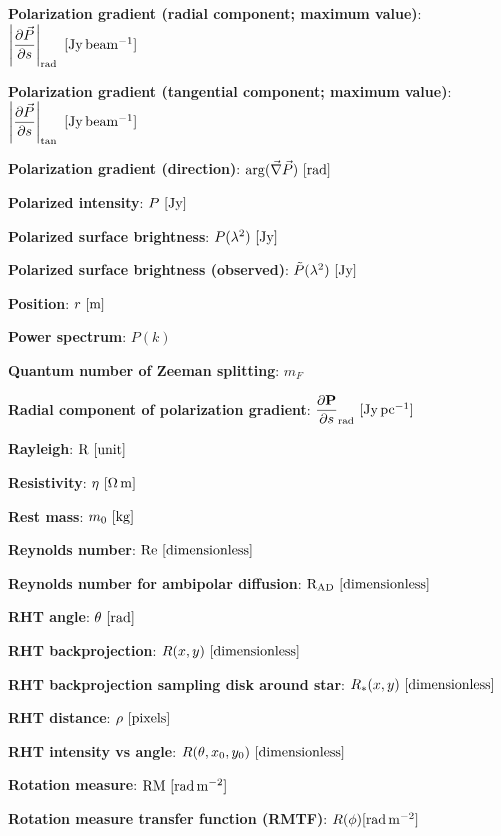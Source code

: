 \documentclass[a4paper,10pt]{article}
\begin{document}
{\noindent}\textbf{Polarization gradient (radial component; maximum value)}: $\left\lvert\dfrac{\partial\vec{P}}{\partial s}\right\rvert_\mathrm{rad}~ [\rm Jy\,beam^{-1}]$

{\noindent}\textbf{Polarization gradient (tangential component; maximum value)}: $\left\lvert\dfrac{\partial\vec{P}}{\partial s}\right\rvert_\mathrm{tan}~ [\rm Jy\,beam^{-1}]$

{\noindent}\textbf{Polarization gradient (direction)}: $\mathrm{arg}(\vec\nabla\vec{P}) ~ [\rm rad]$

{\noindent}\textbf{Polarized intensity}: $P ~ [\rm Jy]$

{\noindent}\textbf{Polarized surface brightness}: $P(\lambda^2) ~ [\rm Jy]$

{\noindent}\textbf{Polarized surface brightness (observed)}: $\tilde{P}(\lambda^2) ~ [\rm Jy]$

{\noindent}\textbf{Position}: $r~[{\rm m}]$

{\noindent}\textbf{Power spectrum}: $P(k)$

{\noindent}\textbf{Quantum number of Zeeman splitting}: $m_F$

{\noindent}\textbf{Radial component of polarization gradient}: $\dfrac{\partial\mathbf{P}}{\partial s}_\mathrm{rad} ~ [{\rm Jy\,pc^{-1}}]$

{\noindent}\textbf{Rayleigh}: ${\rm R} ~ [{\rm unit}]$

{\noindent}\textbf{Resistivity}: $\eta~[{\rm \Omega\,m}]$

{\noindent}\textbf{Rest mass}: $m_0~[{\rm kg}]$

{\noindent}\textbf{Reynolds number}: ${\rm Re}~[{\rm dimensionless}]$

{\noindent}\textbf{Reynolds number for ambipolar diffusion}: ${\rm R}_\mathrm{\rm AD}~[{\rm dimensionless}]$

{\noindent}\textbf{RHT angle}: $\theta~[{\rm rad}]$

{\noindent}\textbf{RHT backprojection}: $R(x,y) ~ [{\rm dimensionless}]$

{\noindent}\textbf{RHT backprojection sampling disk around star}: $R_*(x,y) ~ [{\rm dimensionless}]$

{\noindent}\textbf{RHT distance}: $\rho~[{\rm pixels}]$

{\noindent}\textbf{RHT intensity vs angle}: $R(\theta,x_0,y_0)~[{\rm dimensionless}]$

{\noindent}\textbf{Rotation measure}: ${\rm RM~[rad\,m^{-2}]}$

{\noindent}\textbf{Rotation measure transfer function (RMTF)}: $R(\phi) {\rm [rad\,m^{-2}]}$
\end{document}
